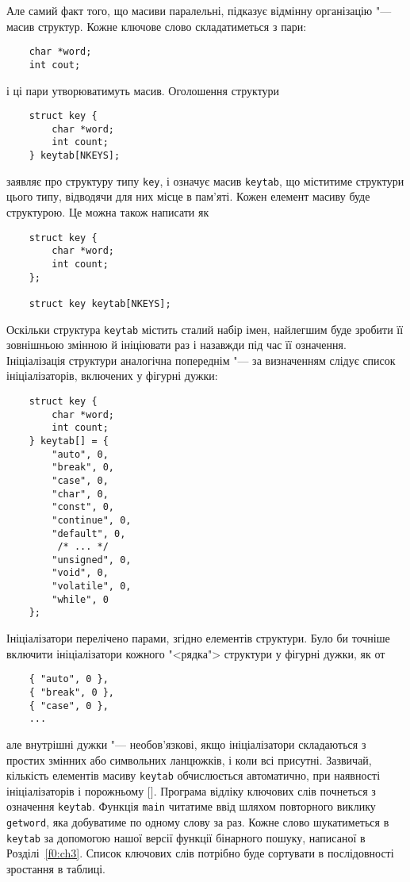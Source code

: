 \documentclass[a4paper,12pt]{book}
\begin{document}
  Але самий факт того, що масиви паралельні, підказує відмінну організацію "--- масив
  структур. Кожне ключове слово складатиметься з пари:
  \begin{verbatim}
    char *word;
    int cout;
  \end{verbatim}
  і ці пари утворюватимуть масив. Оголошення структури
  \begin{verbatim}
    struct key {
        char *word;
        int count;
    } keytab[NKEYS];
  \end{verbatim}
  заявляє про структуру типу \texttt{key}, і означує масив \texttt{keytab}, що міститиме
  структури цього типу, відводячи для них місце в пам'яті. Кожен елемент масиву буде
  структурою. Це можна також написати як
  \begin{verbatim}
    struct key {
        char *word;
        int count;
    };

    struct key keytab[NKEYS];
  \end{verbatim}

  Оскільки структура \texttt{keytab} містить сталий набір імен, найлегшим буде зробити її
  зовнішньою змінною й ініціювати раз і назавжди під час її означення. Ініціалізація
  структури аналогічна попереднім "--- за визначенням слідує список ініціалізаторів,
  включених у фігурні дужки:
  \begin{verbatim}
    struct key {
        char *word;
        int count;
    } keytab[] = {
        "auto", 0,
        "break", 0,
        "case", 0,
        "char", 0,
        "const", 0,
        "continue", 0,
        "default", 0,
         /* ... */
        "unsigned", 0,
        "void", 0,
        "volatile", 0,
        "while", 0
    };
  \end{verbatim}

  Ініціалізатори перелічено парами, згідно елементів структури. Було би точніше
  включити ініціалізатори кожного "<рядка"> структури у фігурні дужки, як от
  \begin{verbatim}
    { "auto", 0 },
    { "break", 0 },
    { "case", 0 },
    ...
  \end{verbatim}
  але внутрішні дужки "--- необов'язкові, якщо ініціалізатори складаються з простих
  змінних або символьних ланцюжків, і коли всі присутні. Зазвичай, кількість елементів
  масиву \texttt{keytab} обчислюється автоматично, при наявності ініціалізаторів і
  порожньому \texttt{\mbox{$[$}\mbox{$]$}}. Програма відліку ключових слів почнеться з
  означення \texttt{keytab}. Функція \texttt{main} читатиме ввід шляхом повторного виклику
  \texttt{getword}, яка добуватиме по одному слову за раз. Кожне слово шукатиметься в
  \texttt{keytab} за допомогою нашої версії функції бінарного пошуку, написаної в 
  Розділі~\ref{f0:ch3}. Список ключових слів потрібно буде сортувати в послідовності 
  зростання в таблиці.
\end{document}

